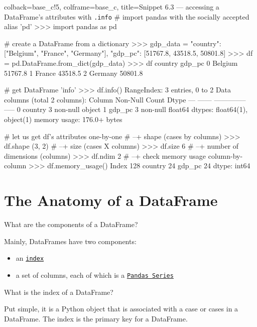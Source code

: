\documentclass[a4paper,11pt]{book}
\numberwithin{figure}{chapter}
\numberwithin{table}{chapter}
\newcommand{\question}[1]{%
    \begin{tcolorbox}[colback=comp_c!10,colframe=comp_c,sidebyside align=top,width=\linewidth,before skip=1ex]
        #1
    \end{tcolorbox}
    \switchcolumn%
}
\newcommand{\note}[1]{%
    \begin{tcolorbox}[colback=white!0,colframe=white!10,width=\linewidth,before skip=1ex]
        #1
    \end{tcolorbox}
}
\begin{document}
\begin{pythoncode}[linenos=true]{colback=base_c!5, colframe=base_c, title=\sffamily Snippet 6.3 --- accessing a DataFrame's attributes with \texttt{.info}}
# import pandas with the socially accepted alias 'pd'
>>> import pandas as pd

# create a DataFrame from a dictionary
>>> gdp_data = {
	"country": ["Belgium", "France", "Germany"],
	"gdp_pc": [51767.8, 43518.5, 50801.8]
    }
>>> df = pd.DataFrame.from_dict(gdp_data)
>>> df
   country   gdp_pc
0  Belgium  51767.8
1   France  43518.5
2  Germany  50801.8

# get DataFrame 'info'
>>> df.info()
RangeIndex: 3 entries, 0 to 2
Data columns (total 2 columns):
     Column   Non-Null Count  Dtype  
---  ------   --------------  -----  
 0   country  3 non-null      object 
 1   gdp_pc   3 non-null      float64
dtypes: float64(1), object(1)
memory usage: 176.0+ bytes

# let us get df's attributes one-by-one
# --+ shape (cases by columns)
>>> df.shape
(3, 2)
# --+ size (cases X columns)
>>> df.size
6
# --+ number of dimensions (columns)
>>> df.ndim
2
# --+ check memory usage column-by-column
>>> df.memory_usage()
Index      128
country     24
gdp_pc      24
dtype: int64

\end{pythoncode}
\clearpage

\section{The Anatomy of a DataFrame}

\begin{paracol}{2}
	\question{\raggedright What are the components of a DataFrame?}
	\note{Mainly, DataFrames have two components:
	
	\begin{itemize}
		\item an \href{https://pandas.pydata.org/docs/reference/api/pandas.DataFrame.index.html}{\texttt{index}}
		\item a set of columns, each of which is a \href{https://pandas.pydata.org/docs/reference/series.html}{\texttt{Pandas Series}}
	\end{itemize}
	}
\end{paracol}

\begin{paracol}{2}
	\question{\raggedright What is the index of a DataFrame?}
	\note{Put simple, it is a Python object that is associated with a case or cases in a DataFrame. The index is the primary key for a DataFrame.}
\end{paracol}
\end{document}
